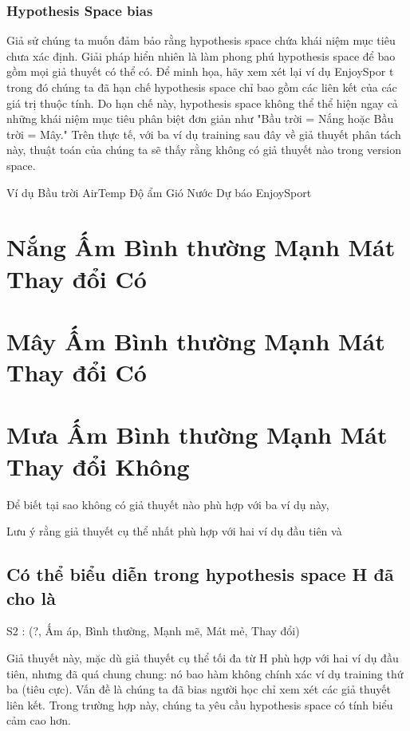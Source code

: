 \subsubsection{Hypothesis Space bias}

Giả sử chúng ta muốn đảm bảo rằng hypothesis space chứa khái niệm mục tiêu chưa xác định. Giải pháp hiển nhiên là làm phong phú hypothesis space để bao gồm mọi giả thuyết có thể có. Để minh họa, hãy xem xét lại ví dụ EnjoySpor t trong đó chúng ta đã hạn chế hypothesis space chỉ bao gồm các liên kết của các giá trị thuộc tính. Do hạn chế này, hypothesis space không thể thể hiện ngay cả những khái niệm mục tiêu phân biệt đơn giản như "Bầu trời = Nắng hoặc Bầu trời = Mây." Trên thực tế, với ba ví dụ training sau đây về giả thuyết phân tách này, thuật toán của chúng ta sẽ thấy rằng không có giả thuyết nào trong version space.

Ví dụ Bầu trời AirTemp Độ ẩm Gió Nước Dự báo EnjoySport

\section{Nắng Ấm Bình thường Mạnh Mát Thay đổi Có}

\section{Mây Ấm Bình thường Mạnh Mát Thay đổi Có}

\section{Mưa Ấm Bình thường Mạnh Mát Thay đổi Không}

Để biết tại sao không có giả thuyết nào phù hợp với ba ví dụ này,

Lưu ý rằng giả thuyết cụ thể nhất phù hợp với hai ví dụ đầu tiên và

\subsection{Có thể biểu diễn trong hypothesis space H đã cho là}

S2 : (?, Ấm áp, Bình thường, Mạnh mẽ, Mát mẻ, Thay đổi)

Giả thuyết này, mặc dù giả thuyết cụ thể tối đa từ H phù hợp với hai ví dụ đầu tiên, nhưng đã quá chung chung: nó bao hàm không chính xác ví dụ training thứ ba (tiêu cực). Vấn đề là chúng ta đã bias người học chỉ xem xét các giả thuyết liên kết. Trong trường hợp này, chúng ta yêu cầu hypothesis space có tính biểu cảm cao hơn.


